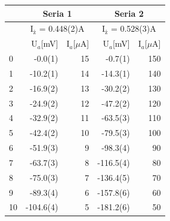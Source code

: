 \documentclass[a4paper,10pt]{article}
\begin{document}
\begin{tabular}{|l|r|r|r|r|}
\toprule
\hline
{} &\multicolumn{2}{c|}{Seria 1} &\multicolumn{2}{c|}{Seria 2}\\\hline
{} &\multicolumn{2}{c|}{I$_ż$ = 0.448(2)A} &\multicolumn{2}{c|}{I$_ż$ = 0.528(3)A}\\\hline
{} &  U$_a$[mV] &  I$_a$[$\mu$A] &  U$_a$[mV] &  I$_a$[$\mu$A] \\\hline
\midrule
0  &     -0.0(1) &        15 &     -0.7(1) &       150 \\\hline
1  &    -10.2(1) &        14 &    -14.3(1) &       140 \\\hline
2  &    -16.9(2) &        13 &    -30.2(2) &       130 \\\hline
3  &    -24.9(2) &        12 &    -47.2(2) &       120 \\\hline
4  &    -32.9(2) &        11 &    -63.5(3) &       110 \\\hline
5  &    -42.4(2) &        10 &    -79.5(3) &       100 \\\hline
6  &    -51.9(3) &         9 &    -98.3(4) &        90 \\\hline
7  &    -63.7(3) &         8 &   -116.5(4) &        80 \\\hline
8  &    -75.0(3) &         7 &   -136.4(5) &        70 \\\hline
9  &    -89.3(4) &         6 &   -157.8(6) &        60 \\\hline
10 &   -104.6(4) &         5 &   -181.2(6) &        50 \\\hline
\bottomrule
\end{tabular}
\end{document}

